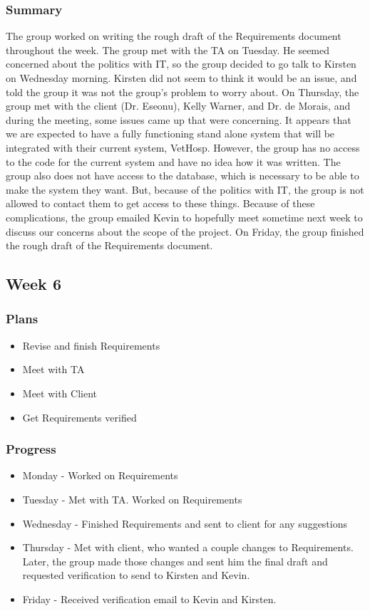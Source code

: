 \documentclass[onecolumn, draftclsnofoot,10pt, compsoc]{IEEEtran}
\begin{document}
\subsubsection{Summary}
The group worked on writing the rough draft of the Requirements document throughout the week. The group met with the TA on Tuesday. He seemed concerned about the politics with IT, so the group decided to go talk to Kirsten on Wednesday morning. Kirsten did not seem to think it would be an issue, and told the group it was not the group's problem to worry about. On Thursday, the group met with the client (Dr. Eseonu), Kelly Warner, and Dr. de Morais, and during the meeting, some issues came up that were concerning. It appears that we are expected to have a fully functioning stand alone system that will be integrated with their current system, VetHosp. However, the group has no access to the code for the current system and have no idea how it was written. The group also does not have access to the database, which is necessary to be able to make the system they want. But, because of the politics with IT, the group is not allowed to contact them to get access to these things. Because of these complications, the group emailed Kevin to hopefully meet sometime next week to discuss our concerns about the scope of the project. On Friday, the group finished the rough draft of the Requirements document. 

\subsection{Week 6}

\subsubsection{Plans}
\begin{itemize}
\item Revise and finish Requirements
\item Meet with TA
\item Meet with Client
\item Get Requirements verified

\end{itemize}

\subsubsection{Progress}
\begin{itemize}
\item Monday - Worked on Requirements
\item Tuesday - Met with TA. Worked on Requirements
\item Wednesday - Finished Requirements and sent to client for any suggestions
\item Thursday - Met with client, who wanted a couple changes to Requirements. Later, the group made those changes and sent him the final draft and requested verification to send to Kirsten and Kevin.
\item Friday - Received verification email to Kevin and  Kirsten. 

\end{itemize}
\end{document}
